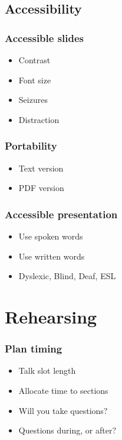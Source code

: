 \documentclass{beamer}
\begin{document}
\subsection{Accessibility}

\begin{frame}[fragile]
\frametitle{Accessible slides}
\begin{itemize}[<+(1)->]
\item Contrast
\item Font size
\item Seizures
\item Distraction
\end{itemize}
\end{frame}

\begin{frame}[fragile]
\frametitle{Portability}
\begin{itemize}[<+(1)->]
\item Text version
\item PDF version
\end{itemize}
\end{frame}

\begin{frame}[fragile]
\frametitle{Accessible presentation}
\begin{itemize}[<+(1)->]
\item Use spoken words
\item Use written words
\item Dyslexic, Blind, Deaf, ESL
\end{itemize}
\end{frame}

\section{Rehearsing}

\begin{frame}[fragile]
\tableofcontents[currentsection]
\end{frame}


\begin{frame}[fragile]
\frametitle{Plan timing}
\begin{itemize}[<+(1)->]
\item Talk slot length
\item Allocate time to sections
\item Will you take questions$?$
\item Questions during, or after$?$
\end{itemize}
\end{frame}
\end{document}

